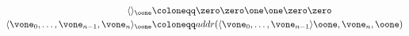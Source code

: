 \begin{defn}
\begin{align*}
\langle\rangle_\oone &\coloneqq \zero\zero \one\one\zero\zero\\
\langle\vone_0, \ldots, \vone_{n-1}, \vone_n\rangle_\oone &\coloneqq addr(\langle\vone_0, \ldots, \vone_{n-1}\rangle \oone, \vone_n, \oone)
\end{align*}
\end{defn}
\begin{comment}
Successor:

\begin{align*}
S(\epsilon, \oone) &\coloneqq \one\\
S(y\zero, \oone)&\coloneqq y\one|_{y\one}\\
S(y\one, \oone)&\coloneqq S(y, \oone)\one|_{y\zero\zero}\\
\end{align*}

Chop:

\begin{align*}
cp(\epsilon, \omega) &\coloneqq \epsilon\\
cp(\vtwo \zero, \oone) &\coloneqq cp(\vtwo, \oone)|_{\vtwo}\\
cp(\vtwo \one, \oone) &\coloneqq \vtwo\one|_{\vtwo\one}\\\\
\end{align*}

Predecessor:

\begin{align*}
\pred'(\epsilon, \omega) &\coloneqq \epsilon\\
\pred'(\vtwo \zero, \oone) &\coloneqq \pred(\vtwo, \oone)\one|_{\zero}\quad(*)\\
\pred'(\vtwo \one, \oone) &\coloneqq \vtwo\zero|_{\vtwo}\\\\
\pred(\vtwo, \oone) &\coloneqq \rv(cp(\rv(\pred'(\vtwo, \oone))))
\end{align*}

Length:

\begin{align*}
\ln(\epsilon, \omega) &\coloneqq \overline 0\\
\ln(\vtwo \zero, \oone) &\coloneqq S(\ln(\vtwo, \oone))|_{\vtwo}\\
\ln(\vtwo \one, \oone) &\coloneqq S(\ln(\vtwo, \oone))|_{\vtwo}\\\\
\end{align*}


\end{comment}

